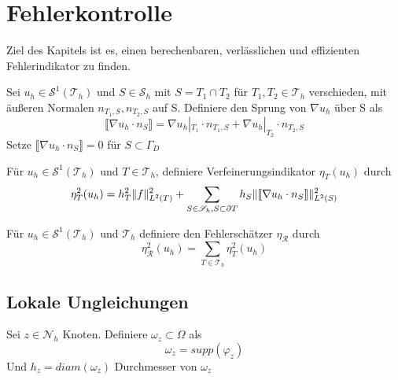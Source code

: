 \chapter{Fehlerkontrolle}
Ziel des Kapitels ist es, einen berechenbaren, verlässlichen und effizienten Fehlerindikator zu finden.

\begin{definition}[Sprung]
	Sei $u_h\in\mathscr{S}^1(\mathscr{T}_h)$ und $S\in\mathscr{S}_h$ mit $S=T_1 \cap T_2$ für $T_1,T_2 \in \mathscr{T}_h$ verschieden, mit äußeren Normalen $n_{T_1,S},n_{T_2,S}$ auf S. Definiere den Sprung von $\nabla u_h$ über S als
	\[
	\llbracket \nabla u_h \cdot n_S\rrbracket = \nabla u_h|_{T_1} \cdot n_{T_1,S} + \nabla u_h|_{T_2} \cdot n_{T_2,S}
	\]
	Setze $\llbracket \nabla u_h \cdot n_S\rrbracket = 0$ f\"ur $S\subset \Gamma_D$
\end{definition}
\begin{definition}[Verfeinerungsindikator]
	Für $u_h \in \mathscr{S}^1(\mathscr{T}_h) \text{ und } T \in \mathscr{T}_h$, definiere Verfeinerungsindikator $\eta_T(u_h)$ durch
	\[
	\eta^2_T(u_h) = h^2_T\|f\|^2_{L^2(T)} + \sum_{S\in\mathscr{S}_h,S\subset\partial T} h_S\|\llbracket \nabla u_h \cdot n_S\rrbracket\|^2_{L^2(S)} \]
\end{definition}
\begin{definition}[Fehlerschätzer]
	Für $u_h \in \mathscr{S}^1(\mathscr{T}_h) \text{ und } \mathscr{T}_h$ definiere den Fehlerschätzer $\eta_\mathscr{R}$ durch
	\[
	\eta_\mathscr{R}^2(u_h)=\sum_{T\in\mathscr{T}_h} \eta^2_T(u_h)
	\]
\end{definition}
\section{Lokale Ungleichungen}
\begin{definition}
	Sei $z \in \mathscr{N}_h$ Knoten. Definiere $\omega_z \subset \Omega$ als
	\[
	\omega_z = supp(\varphi_z)
	\]
	Und $h_z = diam(\omega_z)$ Durchmesser von $\omega_z$
\end{definition}

